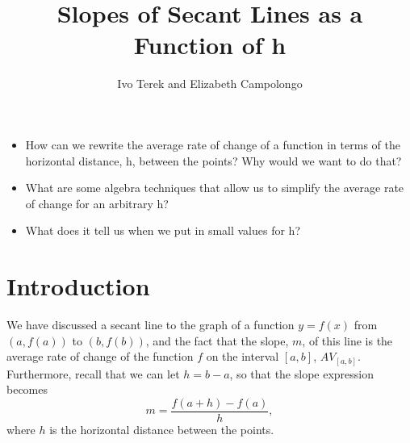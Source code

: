 \documentclass{ximera}
\author{Ivo Terek and Elizabeth Campolongo}
\title{Slopes of Secant Lines as a Function of h}
\begin{document}
\begin{abstract}
  
\end{abstract}
\maketitle



\begin{motivatingQuestions}\begin{itemize}
\item How can we rewrite the average rate of change of a function in terms of the horizontal distance, h, between the points?  Why would we want to do that?
\item What are some algebra techniques that allow us to simplify the average rate of change for an arbitrary h?
\item What does it tell us when we put in small values for h?
\end{itemize}\end{motivatingQuestions}



\section{Introduction}

We have discussed a secant line to the graph of a function $y=f(x)$ from $(a,f(a))$ to $(b,f(b))$, and the fact that the slope, $m$, of this line is the average rate of change of the function $f$ on the interval $[a,b]$, $AV_{[a,b]}$. Furthermore, recall that we can let $h=b-a$, so that the slope expression becomes 
%
$$m=\frac{f(a+h)-f(a)}{h},$$
where $h$ is the horizontal distance between the points.

\begin{image}[2in]
		\end{image}
\end{document}
